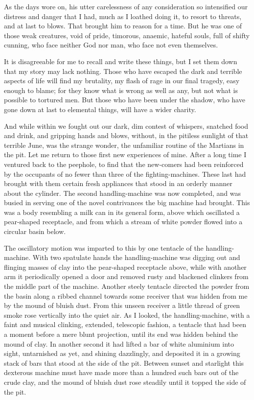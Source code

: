 As the days wore on, his utter carelessness of any consideration so
intensified our distress and danger that I had, much as I loathed
doing it, to resort to threats, and at last to blows. That brought
him to reason for a time. But he was one of those weak creatures,
void of pride, timorous, anaemic, hateful souls, full of shifty
cunning, who face neither God nor man, who face not even
themselves.

It is disagreeable for me to recall and write these things, but I
set them down that my story may lack nothing. Those who have
escaped the dark and terrible aspects of life will find my
brutality, my flash of rage in our final tragedy, easy enough to
blame; for they know what is wrong as well as any, but not what is
possible to tortured men. But those who have been under the shadow,
who have gone down at last to elemental things, will have a wider
charity.

And while within we fought out our dark, dim contest of whispers,
snatched food and drink, and gripping hands and blows, without, in
the pitiless sunlight of that terrible June, was the strange
wonder, the unfamiliar routine of the Martians in the pit. Let me
return to those first new experiences of mine. After a long time I
ventured back to the peephole, to find that the new-comers had been
reinforced by the occupants of no fewer than three of the
fighting-machines. These last had brought with them certain fresh
appliances that stood in an orderly manner about the cylinder. The
second handling-machine was now completed, and was busied in
serving one of the novel contrivances the big machine had brought.
This was a body resembling a milk can in its general form, above
which oscillated a pear-shaped receptacle, and from which a stream
of white powder flowed into a circular basin below.

The oscillatory motion was imparted to this by one tentacle of the
handling-machine. With two spatulate hands the handling-machine was
digging out and flinging masses of clay into the pear-shaped
receptacle above, while with another arm it periodically opened a
door and removed rusty and blackened clinkers from the middle part
of the machine. Another steely tentacle directed the powder from
the basin along a ribbed channel towards some receiver that was
hidden from me by the mound of bluish dust. From this unseen
receiver a little thread of green smoke rose vertically into the
quiet air. As I looked, the handling-machine, with a faint and
musical clinking, extended, telescopic fashion, a tentacle that had
been a moment before a mere blunt projection, until its end was
hidden behind the mound of clay. In another second it had lifted a
bar of white aluminium into sight, untarnished as yet, and shining
dazzlingly, and deposited it in a growing stack of bars that stood
at the side of the pit. Between sunset and starlight this dexterous
machine must have made more than a hundred such bars out of the
crude clay, and the mound of bluish dust rose steadily until it
topped the side of the pit.

